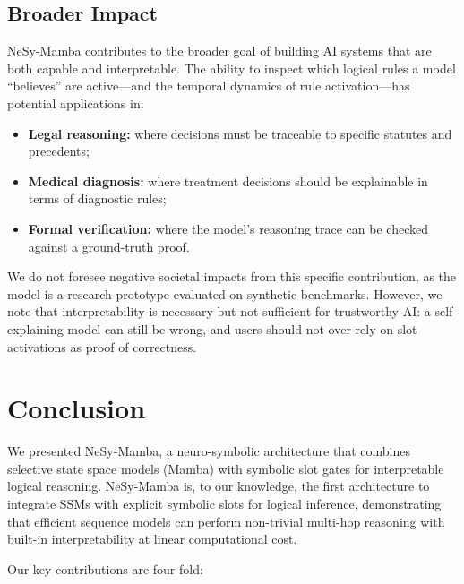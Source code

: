 \documentclass[conference]{IEEEtran}
\DeclareRobustCommand{\model}{NeSy-Mamba}
\begin{document}
\subsection{Broader Impact}

\model{} contributes to the broader goal of building AI systems
that are both capable and interpretable.  The ability to inspect
which logical rules a model ``believes'' are active---and the
temporal dynamics of rule activation---has potential applications
in:

\begin{itemize}[nosep]
    \item \textbf{Legal reasoning:} where decisions must be
          traceable to specific statutes and precedents;
    \item \textbf{Medical diagnosis:} where treatment decisions
          should be explainable in terms of diagnostic rules;
    \item \textbf{Formal verification:} where the model's
          reasoning trace can be checked against a ground-truth
          proof.
\end{itemize}

We do not foresee negative societal impacts from this specific
contribution, as the model is a research prototype evaluated on
synthetic benchmarks.  However, we note that interpretability
is necessary but not sufficient for trustworthy AI:
a self-explaining model can still be wrong, and users should
not over-rely on slot activations as proof of correctness.


\section{Conclusion}
\label{sec:conclusion}

We presented \model{}, a neuro-symbolic architecture that combines
selective state space models (Mamba) with symbolic slot gates for
interpretable logical reasoning.  \model{} is, to our knowledge,
the first architecture to integrate SSMs with explicit symbolic
slots for logical inference, demonstrating that efficient
sequence models can perform non-trivial multi-hop reasoning with
built-in interpretability at linear computational cost.

Our key contributions are four-fold:
\end{document}
